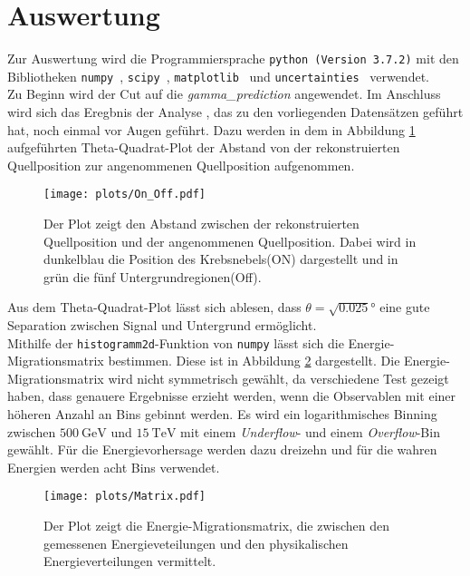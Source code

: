 \section{Auswertung}
Zur Auswertung wird die Programmiersprache \texttt{python (Version 3.7.2)} mit
den Bibliotheken \texttt{numpy}~\cite{numpy}, \texttt{scipy}~\cite{scipy},  \texttt{matplotlib}~\cite{matplotlib} und \texttt{uncertainties}~\cite{uncertainties} verwendet.\\
Zu Beginn wird der Cut auf die \textit{gamma\_prediction} angewendet. Im Anschluss wird sich das Eregbnis der Analyse \cite{FACTanalyse}, das zu den vorliegenden Datensätzen geführt hat, noch einmal vor Augen geführt. Dazu werden in dem in Abbildung \ref{fig:Theta2} aufgeführten Theta-Quadrat-Plot der Abstand von der rekonstruierten Quellposition zur angenommenen Quellposition aufgenommen. \\
\begin{figure}
  \centering
  \texttt{[image: plots/On\_Off.pdf]}
  \caption{Der Plot zeigt den Abstand zwischen der rekonstruierten Quellposition und der angenommenen Quellposition. Dabei wird in dunkelblau die Position des Krebsnebels(ON) dargestellt und in grün die fünf Untergrundregionen(Off).}
  \label{fig:Theta2}
\end{figure}
Aus dem Theta-Quadrat-Plot lässt sich ablesen, dass $\theta = \sqrt{0.025}\si{\degree}$ eine gute Separation zwischen Signal und Untergrund ermöglicht.\\
Mithilfe der \texttt{histogramm2d}-Funktion von \texttt{numpy} lässt sich die Energie-Migrationsmatrix bestimmen. Diese ist in Abbildung \ref{fig:mig} dargestellt. Die Energie-Migrationsmatrix wird nicht symmetrisch gewählt, da verschiedene Test gezeigt haben, dass genauere Ergebnisse erzieht werden, wenn die Observablen mit einer höheren Anzahl an Bins gebinnt werden. Es wird ein logarithmisches Binning zwischen $\SI{500}{\giga\electronvolt}$ und $\SI{15}{\tera\electronvolt}$ mit einem \textit{Underflow}- und einem \textit{Overflow}-Bin gewählt. Für die Energievorhersage werden dazu dreizehn und für die wahren Energien werden acht Bins verwendet.\\
\begin{figure}
  \centering
  \texttt{[image: plots/Matrix.pdf]}
  \caption{Der Plot zeigt die Energie-Migrationsmatrix, die zwischen den gemessenen Energieveteilungen und den physikalischen Energieverteilungen vermittelt.}
  \label{fig:mig}
\end{figure}
